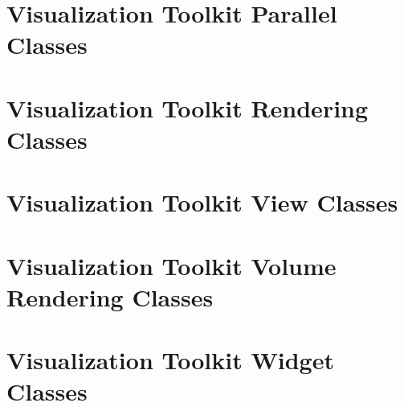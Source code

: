 \documentclass{book}
\begin{document}
\chapter{Visualization Toolkit Parallel Classes}
\label{sec_vtkparallel}
\hypertarget{sec_vtkparallel}{}

\chapter{Visualization Toolkit Rendering Classes}
\label{sec_vtkrendering}
\hypertarget{sec_vtkrendering}{}

\chapter{Visualization Toolkit View Classes}
\label{sec_vtkviews}
\hypertarget{sec_vtkviews}{}

\chapter{Visualization Toolkit Volume Rendering Classes}
\label{sec_vtkvolumerendering}
\hypertarget{sec_vtkvolumerendering}{}

\chapter{Visualization Toolkit Widget Classes}
\label{sec_vtkwidgets}
\hypertarget{sec_vtkwidgets}{}

\printindex
\end{document}
